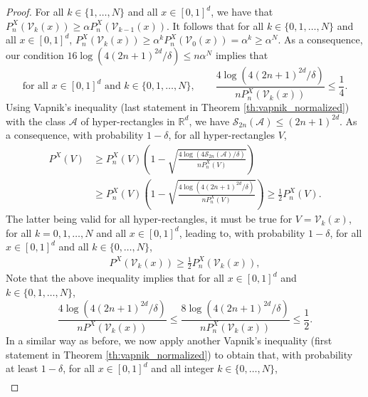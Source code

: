 \documentclass[paper=a4, fontsize=11pt]{scrartcl}
\begin{document}
\begin{proof}
For all $k\in \{1,\ldots, N\}$ and all $x\in [0,1]^d$, we have that $P_n^X(\mathcal V_k(x)) \geq \alpha P_n^X(\mathcal{V}_{k-1}(x))$. It follows that for all $k\in \{0,1,\ldots, N\}$ and all $x\in [0,1]^d$, $ P_n^X(\mathcal V_k(x))  \geq  \alpha^{k} P_n^X(\mathcal{V}_0(x)) = \alpha^{k}\geq \alpha^N $. As a consequence, our condition $16 \log( 4 (2n+1)^{2d} / \delta) \leq n \alpha^{N}$ implies that 
$$ \text{for all }x\in [0,1]^d \text{ and } k\in \{0,1,\ldots, N\} , \qquad \frac{ 4 \log( 4 (2n+1)^{2d} / \delta) }{ n P_n^X(\mathcal V_k(x)) } \leq \frac 1  4. $$ 
Using Vapnik's inequality (last statement in Theorem \ref{th:vapnik_normalized}) with the class $\mathcal{A}$ of hyper-rectangles in $\mathbb{R}^d$, we have $\mathcal{S}_{2n}(\mathcal{A}) \leq (2n+1)^{2d}$. As a consequence, with probability $1-\delta$, for all hyper-rectangles $V$,
\begin{align*}
    P^X(V) &\geq P_n^X (V) \left(1-\sqrt { \frac{4 \log( 4 \mathcal{S}_{2n}(\mathcal{A}) / \delta) }{ nP_n^X (V)} } \right) \\
    &\geq P_n^X (V) \left(1-\sqrt { \frac{4 \log( 4 (2n+1)^{2d}  / \delta) }{ nP_n^X (V)} } \right)\geq \frac 1 2 P_n^X (V). 
\end{align*}
The latter being valid for all hyper-rectangles, it must be true for $V = \mathcal{V}_{k}(x) $, for all $k = 0,1,\ldots, N$ and all $x\in [0,1]^d$, leading to, with probability $1-\delta$, for all  $x\in [0,1]^d$ and all $k\in \{ 0,\ldots, N\}$,
\begin{align}\label{event1_}
  P^X (\mathcal{V}_{k}(x) ) \geq \frac 1 2  P_n^X (\mathcal{V}_{k}(x) ),%
\end{align}
Note that the above inequality implies that for all $x\in [0,1]^d$ and $k\in \{0,1,\ldots, N \}$,
$$ \frac{ 4 \log( 4 (2n+1)^{2d} / \delta) }{ n P^X(\mathcal V_k(x)) } \leq \frac{ 8 \log( 4 (2n+1)^{2d} / \delta) }{ n P^X_n(\mathcal V_k(x)) }\leq \frac 1  2. $$ 
In a similar way as before, we now apply another Vapnik's inequality (first statement in Theorem \ref{th:vapnik_normalized}) to obtain that, with probability at least $1 - \delta$, for  all $x\in [0,1]^d$ and all integer $k \in \{0,\dots,N\}$,
\begin{align}\label{event2_} 

\end{align}
\end{proof}
\end{document}
